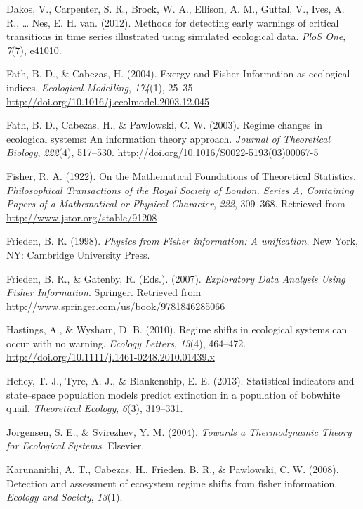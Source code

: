 \documentclass[12pt,twoside]{reedthesis}
\begin{document}
\hypertarget{ref-dakos_methods_2012}{}
Dakos, V., Carpenter, S. R., Brock, W. A., Ellison, A. M., Guttal, V.,
Ives, A. R., \ldots{} Nes, E. H. van. (2012). Methods for detecting
early warnings of critical transitions in time series illustrated using
simulated ecological data. \emph{PloS One}, \emph{7}(7), e41010.

\hypertarget{ref-fath_exergy_2004}{}
Fath, B. D., \& Cabezas, H. (2004). Exergy and Fisher Information as
ecological indices. \emph{Ecological Modelling}, \emph{174}(1), 25--35.
\url{http://doi.org/10.1016/j.ecolmodel.2003.12.045}

\hypertarget{ref-fath_regime_2003}{}
Fath, B. D., Cabezas, H., \& Pawlowski, C. W. (2003). Regime changes in
ecological systems: An information theory approach. \emph{Journal of
Theoretical Biology}, \emph{222}(4), 517--530.
\url{http://doi.org/10.1016/S0022-5193(03)00067-5}

\hypertarget{ref-fisher_mathematical_1922}{}
Fisher, R. A. (1922). On the Mathematical Foundations of Theoretical
Statistics. \emph{Philosophical Transactions of the Royal Society of
London. Series A, Containing Papers of a Mathematical or Physical
Character}, \emph{222}, 309--368. Retrieved from
\url{http://www.jstor.org/stable/91208}

\hypertarget{ref-frieden_physics_1998}{}
Frieden, B. R. (1998). \emph{Physics from Fisher information: A
unification.} New York, NY: Cambridge University Press.

\hypertarget{ref-frieden_exploratory_2007}{}
Frieden, B. R., \& Gatenby, R. (Eds.). (2007). \emph{Exploratory Data
Analysis Using Fisher Information}. Springer. Retrieved from
\url{http://www.springer.com/us/book/9781846285066}

\hypertarget{ref-hastings_regime_2010}{}
Hastings, A., \& Wysham, D. B. (2010). Regime shifts in ecological
systems can occur with no warning. \emph{Ecology Letters}, \emph{13}(4),
464--472. \url{http://doi.org/10.1111/j.1461-0248.2010.01439.x}

\hypertarget{ref-hefley2013statistical}{}
Hefley, T. J., Tyre, A. J., \& Blankenship, E. E. (2013). Statistical
indicators and state--space population models predict extinction in a
population of bobwhite quail. \emph{Theoretical Ecology}, \emph{6}(3),
319--331.

\hypertarget{ref-jorgensen_towards_2004}{}
Jorgensen, S. E., \& Svirezhev, Y. M. (2004). \emph{Towards a
Thermodynamic Theory for Ecological Systems}. Elsevier.

\hypertarget{ref-karunanithi_detection_2008}{}
Karunanithi, A. T., Cabezas, H., Frieden, B. R., \& Pawlowski, C. W.
(2008). Detection and assessment of ecosystem regime shifts from fisher
information. \emph{Ecology and Society}, \emph{13}(1).
\end{document}
